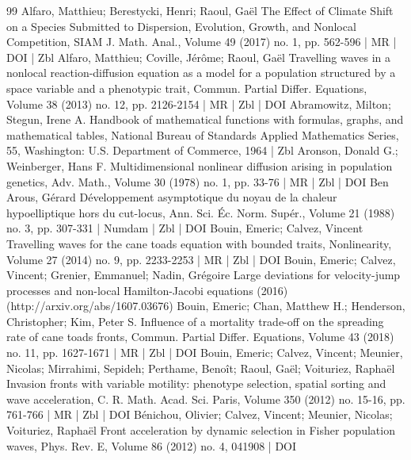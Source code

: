 \documentclass[10pt]{amsart}
\theoremstyle{definition}\newtheorem{defi}[theo]{Definition}\newtheorem{rema}[theo]{Remark}\newtheorem{exam}[theo]{Example}\newtheorem{exem}[theo]{Example}\newtheorem{nota}[theo]{Notation}
\newcommand{\1}{\mathds{1}}
\begin{document}
\vspace{20pt}


\begin{thebibliography}{99}
Alfaro, Matthieu; Berestycki, Henri; Raoul, Gaël The Effect of Climate Shift on a Species Submitted to Dispersion, Evolution, Growth, and Nonlocal Competition, SIAM J. Math. Anal., Volume 49 (2017) no. 1, pp. 562-596 | MR | DOI | Zbl
Alfaro, Matthieu; Coville, Jérôme; Raoul, Gaël Travelling waves in a nonlocal reaction-diffusion equation as a model for a population structured by a space variable and a phenotypic trait, Commun. Partial Differ. Equations, Volume 38 (2013) no. 12, pp. 2126-2154 | MR | Zbl | DOI
Abramowitz, Milton; Stegun, Irene A. Handbook of mathematical functions with formulas, graphs, and mathematical tables, National Bureau of Standards Applied Mathematics Series, 55, Washington: U.S. Department of Commerce, 1964 | Zbl
Aronson, Donald G.; Weinberger, Hans F. Multidimensional nonlinear diffusion arising in population genetics, Adv. Math., Volume 30 (1978) no. 1, pp. 33-76 | MR | Zbl | DOI
Ben Arous, Gérard Développement asymptotique du noyau de la chaleur hypoelliptique hors du cut-locus, Ann. Sci. Éc. Norm. Supér., Volume 21 (1988) no. 3, pp. 307-331 | Numdam | Zbl | DOI
Bouin, Emeric; Calvez, Vincent Travelling waves for the cane toads equation with bounded traits, Nonlinearity, Volume 27 (2014) no. 9, pp. 2233-2253 | MR | Zbl | DOI
Bouin, Emeric; Calvez, Vincent; Grenier, Emmanuel; Nadin, Grégoire Large deviations for velocity-jump processes and non-local Hamilton-Jacobi equations (2016) (http://arxiv.org/abs/1607.03676)
Bouin, Emeric; Chan, Matthew H.; Henderson, Christopher; Kim, Peter S. Influence of a mortality trade-off on the spreading rate of cane toads fronts, Commun. Partial Differ. Equations, Volume 43 (2018) no. 11, pp. 1627-1671 | MR | Zbl | DOI
Bouin, Emeric; Calvez, Vincent; Meunier, Nicolas; Mirrahimi, Sepideh; Perthame, Benoît; Raoul, Gaël; Voituriez, Raphaël Invasion fronts with variable motility: phenotype selection, spatial sorting and wave acceleration, C. R. Math. Acad. Sci. Paris, Volume 350 (2012) no. 15-16, pp. 761-766 | MR | Zbl | DOI
Bénichou, Olivier; Calvez, Vincent; Meunier, Nicolas; Voituriez, Raphaël Front acceleration by dynamic selection in Fisher population waves, Phys. Rev. E, Volume 86 (2012) no. 4, 041908 | DOI

\end{thebibliography}
\end{document}
